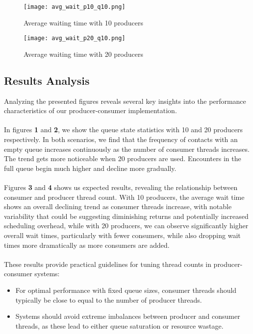 \documentclass[12pt]{article}
\begin{document}
\newpage
\begin{figure}[!h]
    \centering
    \begin{minipage}{0.48\textwidth}
        \centering
        \texttt{[image: avg\_wait\_p10\_q10.png]}
        \caption{Average waiting time with 10 producers}
        \label{fig:queue-p10}
    \end{minipage}%
    \hfill
    \begin{minipage}{0.48\textwidth}
        \centering
        \texttt{[image: avg\_wait\_p20\_q10.png]}
        \caption{Average waiting time with 20 producers}
        \label{fig:queue-p20}
    \end{minipage}
\end{figure}

\subsection{Results Analysis}
Analyzing the presented figures reveals several key insights into the performance characteristics of our producer-consumer implementation.

\paragraph{}
In figures \textbf{1} and \textbf{2}, we show the queue state statistics with 10 and 20 producers respectively. In both scenarios, we find that the frequency of contacts with an empty queue increases continuously as the number of consumer threads increases.  The trend gets more noticeable when 20 producers are used.  Encounters in the full queue begin much higher and decline more gradually.

\paragraph{}
Figures \textbf{3} and \textbf{4} shows us expected results, revealing the relationship between consumer and producer thread count. With 10 producers, the average wait time shows an overall declining trend as consumer threads increase, with notable variability that could be suggesting diminishing returns and potentially increased scheduling overhead, while with 20 producers, we can observe significantly higher overall wait times, particularly with fewer consumers, while also dropping wait times more dramatically as more consumers are added.

\paragraph{}
These results provide practical guidelines for tuning thread counts in producer-consumer systems:
\begin{itemize}
    \item For optimal performance with fixed queue sizes, consumer threads should typically be close to equal to the number of producer threads.
    \item Systems should avoid extreme imbalances between producer and consumer threads, as these lead to either queue saturation or resource wastage.
\end{itemize}
\end{document}
